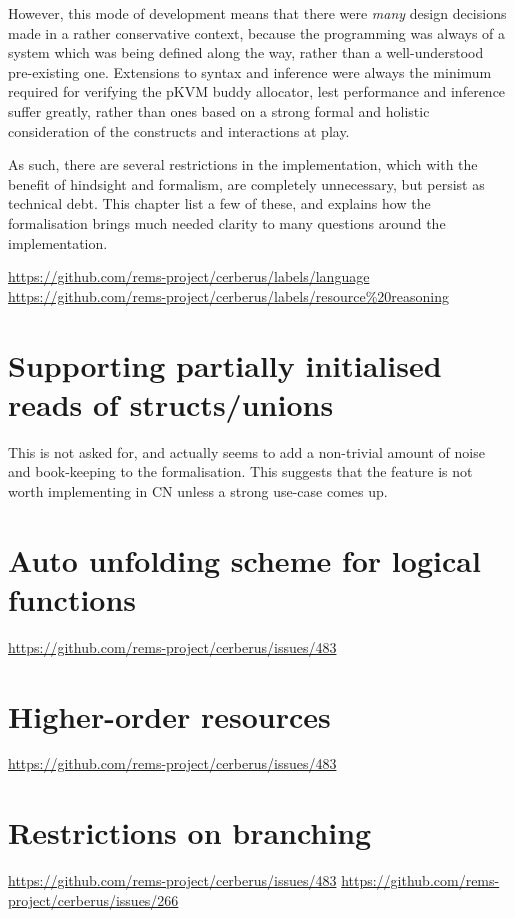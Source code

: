 However, this mode of development means that there were \emph{many} design
decisions made in a rather conservative context, because the programming was
always of a system which was being defined along the way, rather than a
well-understood pre-existing one. Extensions to syntax and inference were
always the minimum required for verifying the pKVM buddy allocator, lest
performance and inference suffer greatly, rather than ones based on a strong
formal and holistic consideration of the constructs and interactions at play.

As such, there are several restrictions in the implementation, which with the
benefit of hindsight and formalism, are completely unnecessary, but persist as
technical debt. This chapter list a few of these, and explains how the
formalisation brings much needed clarity to many questions around the
implementation.

\url{https://github.com/rems-project/cerberus/labels/language}
\url{https://github.com/rems-project/cerberus/labels/resource\%20reasoning}

\section{Supporting partially initialised reads of structs/unions}

This is not asked for, and actually seems to add a non-trivial amount of noise
and book-keeping to the formalisation. This suggests that the feature is not
worth implementing in CN unless a strong use-case comes up.

\section{Auto unfolding scheme for logical functions}
\url{https://github.com/rems-project/cerberus/issues/483}

\section{Higher-order resources}
\url{https://github.com/rems-project/cerberus/issues/483}

\section{Restrictions on branching}\label{sec:restriction-branching}
\url{https://github.com/rems-project/cerberus/issues/483}
\url{https://github.com/rems-project/cerberus/issues/266}

